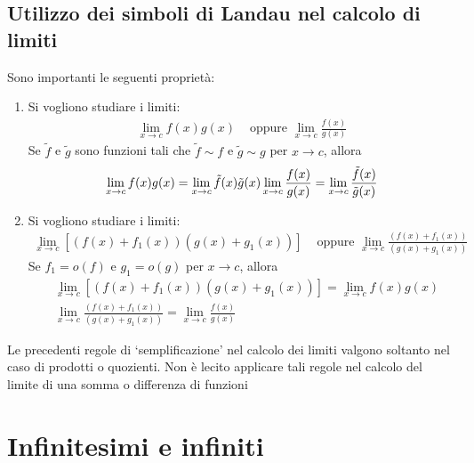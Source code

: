 \documentclass{book}
\begin{document}
\noindent\begin{minipage}{\textwidth}
  \begin{proposition}
    \subsection{Utilizzo dei simboli di Landau nel calcolo di limiti}
    Sono importanti le seguenti proprietà:
    \begin{enumerate}[label=\roman*., start=1]
      \item  Si vogliono studiare i limiti:
            \begin{align*}
              \lim_{x \to c} f(x)g(x) & \text{ oppure } \lim_{x \to c} \frac{f(x)}{g(x)}
            \end{align*}
            Se \(\tilde{f}\) e \(\tilde{g}\) sono funzioni tali che \(\tilde{f} \sim f\) e \(\tilde{g} \sim g\) per \(x \to c\), allora
            \begin{equation*}
              \lim_{x \to c} f(x)g(x) = \lim_{x \to c} \tilde{f}(x)\tilde{g}(x) \\
              \lim_{x \to c} \frac{f(x)}{g(x)} = \lim_{x \to c} \frac{\tilde{f}(x)}{\tilde{g}(x)}
            \end{equation*}
      \item Si vogliono studiare i limiti:
            \begin{align*}
              \lim_{x \to c} [(f(x) + f_1(x))(g(x) + g_1(x))] & \text{ oppure } \lim_{x \to c} \frac{(f(x) + f_1(x))}{(g(x) + g_1(x))}
            \end{align*}
            Se \(f_1 = o(f)\) e \(g_1 = o(g)\) per \(x \to c\), allora
            \begin{align*}
               & \lim_{x \to c} [(f(x) + f_1(x))(g(x) + g_1(x))]         = \lim_{x \to c} f(x)g(x)          \\
               & \lim_{x \to c} \frac{(f(x) + f_1(x))}{(g(x) + g_1(x))}  = \lim_{x \to c} \frac{f(x)}{g(x)}
            \end{align*}
    \end{enumerate}
  \end{proposition}
  Le precedenti regole di ‘semplificazione’ nel calcolo dei limiti valgono soltanto
  nel caso di prodotti o quozienti. Non è lecito applicare tali regole nel
  calcolo del limite di una somma o differenza di funzioni
\end{minipage}

\section{Infinitesimi e infiniti}
\end{document}
